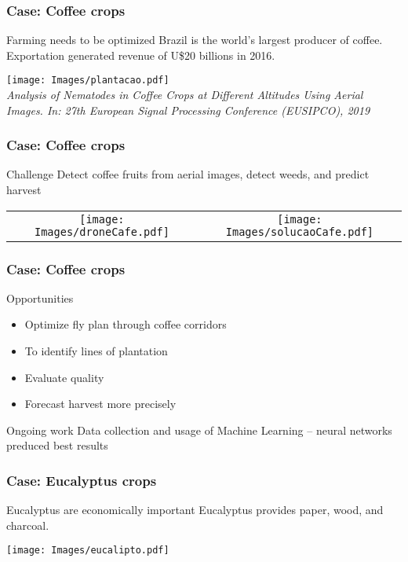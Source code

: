 \documentclass{beamer}
\begin{document}
\begin{frame}\frametitle{Case: Coffee crops}
  \begin{alertblock}{Farming needs to be optimized}
Brazil is the world’s largest producer of coffee. Exportation generated revenue of U\$20 billions in 2016.
  \end{alertblock}

  \centering
  \texttt{[image: Images/plantacao.pdf]}\\
  \textit{Analysis of Nematodes in Coffee Crops at Different Altitudes Using Aerial Images. In: 27th European Signal Processing Conference (EUSIPCO), 2019}
\end{frame}

\begin{frame}\frametitle{Case: Coffee crops}
  \begin{block}{Challenge}
Detect coffee fruits from aerial images, detect weeds, and predict harvest
  \end{block}
\centering
  \begin{tabular}{cc}
    \texttt{[image: Images/droneCafe.pdf]} &     \texttt{[image: Images/solucaoCafe.pdf]} 
  \end{tabular}
\end{frame}

\begin{frame}\frametitle{Case: Coffee crops}
	\begin{exampleblock}{Opportunities}
    \begin{itemize}
      \item Optimize fly plan through coffee corridors
      \item To identify lines of plantation 
      \item Evaluate quality 
      \item Forecast harvest more precisely
    \end{itemize}
	\end{exampleblock}

  \begin{alertblock}{Ongoing work}
    Data collection and usage of Machine Learning -- neural networks preduced best results
  \end{alertblock}
\end{frame}

\begin{frame}\frametitle{Case: Eucalyptus crops}
  \begin{alertblock}{Eucalyptus are economically important}
Eucalyptus provides paper, wood, and charcoal.
  \end{alertblock}

  \centering
    \texttt{[image: Images/eucalipto.pdf]} 
\end{frame}
\end{document}

